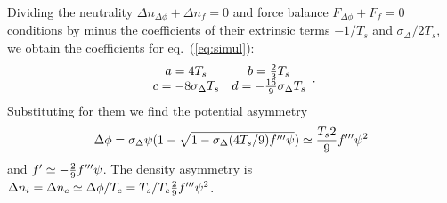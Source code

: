 \documentclass[12pt]{article}
\begin{document}
Dividing the neutrality $\Delta n_{\Delta\phi}+ \Delta n_f=0$ and
force balance $F_{\Delta\phi}+F_f=0$ conditions by minus the
coefficients of their extrinsic terms $-1/T_s$ and
$\sigma_\Delta/2T_s$, we obtain the coefficients for eq.\
(\ref{eq:simul}):
\begin{equation}
  \label{eq:coefs}
  \begin{array}{cc}
    a=4T_s&b={2\over 3}T_s\\
    c=-8\sigma_\Delta T_s& d=-{16\over 9}\sigma_\Delta T_s
  \end{array}.
\end{equation}
Substituting for them we find the potential asymmetry
\begin{equation}
  \label{eq:subst}
  \Delta\phi=\sigma_\Delta\psi(1 -\sqrt{1 -\sigma_\Delta (4T_s/9)f'''\psi})
  \simeq {T_s2\over9}f''' \psi^2
\end{equation}
and $f'\simeq -{2\over 9}f'''\psi$. The density asymmetry is $\Delta
n_i=\Delta n_e\simeq \Delta\phi/T_e = T_s/T_e {2\over 9}f'''\psi^2$.
\end{document}
